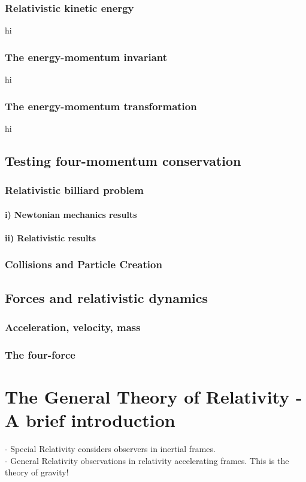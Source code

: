 \documentclass[a4paper,11pt]{article}
\numberwithin{equation}{section}
\begin{document}
  \subsubsection{Relativistic kinetic energy}
  hi
  \subsubsection{The energy-momentum invariant}
  hi
  \subsubsection{The energy-momentum transformation}
  hi
 
 \subsection{Testing four-momentum conservation}
 \subsubsection{Relativistic billiard problem}
 \paragraph{i) Newtonian mechanics results}
 \paragraph{ii) Relativistic results}
 \subsubsection{Collisions and Particle Creation}
 
 \subsection{Forces and relativistic dynamics}
 \subsubsection{Acceleration, velocity, mass}
 \subsubsection{The four-force}
 
 \section{The General Theory of Relativity - A brief introduction}
 - Special Relativity considers observers in inertial frames.\\
 - General Relativity observations in relativity accelerating frames. This is the theory of gravity!
 
\end{document}

